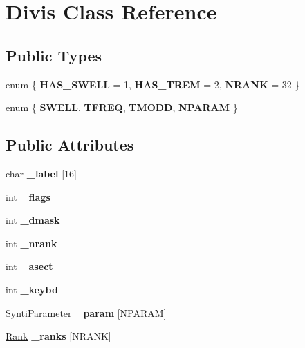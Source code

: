 \hypertarget{class_divis}{}\section{Divis Class Reference}
\label{class_divis}
\subsection*{Public Types}
\begin{DoxyCompactItemize}
\item 
\mbox{\label{class_divis_a9e9aeed01285329d4210fbfd93a88692}} 
enum \{ {\bfseries H\+A\+S\+\_\+\+S\+W\+E\+LL} = 1, 
{\bfseries H\+A\+S\+\_\+\+T\+R\+EM} = 2, 
{\bfseries N\+R\+A\+NK} = 32
 \}
\item 
\mbox{\label{class_divis_ab2ff31c6d2cd891aec1a5ee47fe173b6}} 
enum \{ {\bfseries S\+W\+E\+LL}, 
{\bfseries T\+F\+R\+EQ}, 
{\bfseries T\+M\+O\+DD}, 
{\bfseries N\+P\+A\+R\+AM}
 \}
\end{DoxyCompactItemize}
\subsection*{Public Attributes}
\begin{DoxyCompactItemize}
\item 
\mbox{\label{class_divis_a8f04c6e28b2ed14bfddd6f013a3e9e48}} 
char {\bfseries \+\_\+label} \mbox{[}16\mbox{]}
\item 
\mbox{\label{class_divis_a071385f3a764a4c6aff9b06ab0685437}} 
int {\bfseries \+\_\+flags}
\item 
\mbox{\label{class_divis_a8e9cd70445a0cfc4a4644398bfc04aef}} 
int {\bfseries \+\_\+dmask}
\item 
\mbox{\label{class_divis_ae1c96595c07163859acb7e568f675927}} 
int {\bfseries \+\_\+nrank}
\item 
\mbox{\label{class_divis_a31b317578a0abe278a0c9e8cb117664d}} 
int {\bfseries \+\_\+asect}
\item 
\mbox{\label{class_divis_a0bea48888f5978c6e071d3aa2b2d24f8}} 
int {\bfseries \+\_\+keybd}
\item 
\mbox{\label{class_divis_a2386e47b03e7c4126c12d4d616657667}} 
\hyperlink{class_synti_parameter}{Synti\+Parameter} {\bfseries \+\_\+param} \mbox{[}N\+P\+A\+R\+AM\mbox{]}
\item 
\mbox{\label{class_divis_aea97c55fc5d51a8a302741f9bc2987d2}} 
\hyperlink{class_rank}{Rank} {\bfseries \+\_\+ranks} \mbox{[}N\+R\+A\+NK\mbox{]}
\end{DoxyCompactItemize}


